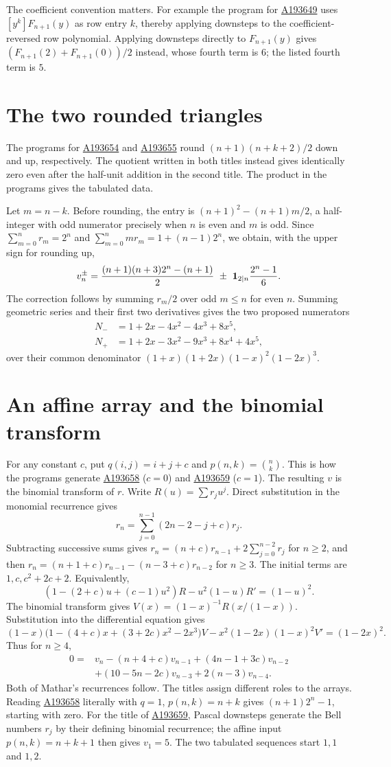 \documentclass[11pt,letterpaper]{article}
\newcommand{\oeis}[1]{\href{https://oeis.org/A#1}{A#1}}
\begin{document}
The coefficient convention matters. For example the program for \oeis{193649} uses $[y^k]F_{n+1}(y)$ as row entry $k$, thereby applying downsteps to the coefficient-reversed row polynomial. Applying downsteps directly to $F_{n+1}(y)$ gives $(F_{n+1}(2)+F_{n+1}(0))/2$ instead, whose fourth term is $6$; the listed fourth term is $5$.

\section{The two rounded triangles}
The programs for \oeis{193654} and \oeis{193655} round $(n+1)(n+k+2)/2$ down and up, respectively. The quotient written in both titles instead gives identically zero even after the half-unit addition in the second title. The product in the programs gives the tabulated data.

Let $m=n-k$. Before rounding, the entry is $(n+1)^2-(n+1)m/2$, a half-integer with odd numerator precisely when $n$ is even and $m$ is odd. Since $\sum_{m=0}^n r_m=2^n$ and $\sum_{m=0}^n mr_m=1+(n-1)2^n$, we obtain, with the upper sign for rounding up,
\[
 v_n^\pm=\frac{(n+1)(n+3)2^n-(n+1)}2
          \ \pm\ {\bf1}_{2\mid n}\frac{2^n-1}{6}.
\]
The correction follows by summing $r_m/2$ over odd $m\le n$ for even $n$. Summing geometric series and their first two derivatives gives the two proposed numerators
\begin{align*}
 N_-&=1+2x-4x^2-4x^3+8x^5,\\
 N_+&=1+2x-3x^2-9x^3+8x^4+4x^5,
\end{align*}
over their common denominator $(1+x)(1+2x)(1-x)^2(1-2x)^3$.

\section{An affine array and the binomial transform}
For any constant $c$, put $q(i,j)=i+j+c$ and $p(n,k)=\binom nk$. This is how the programs generate \oeis{193658} ($c=0$) and \oeis{193659} ($c=1$). The resulting $v$ is the binomial transform of $r$. Write $R(u)=\sum r_ju^j$. Direct substitution in the monomial recurrence gives
\[
 r_n=\sum_{j=0}^{n-1}(2n-2-j+c)r_j .
\]
Subtracting successive sums gives $r_n=(n+c)r_{n-1}+2\sum_{j=0}^{n-2}r_j$ for $n\ge2$, and then
$r_n=(n+1+c)r_{n-1}-(n-3+c)r_{n-2}$ for $n\ge3$.
The initial terms are $1,c,c^2+2c+2$. Equivalently,
\[
 (1-(2+c)u+(c-1)u^2)R-u^2(1-u)R'=(1-u)^2.
\]
The binomial transform gives $V(x)=(1-x)^{-1}R(x/(1-x))$. Substitution into the differential equation gives
\[
 (1-x)\bigl(1-(4+c)x+(3+2c)x^2-2x^3\bigr)V
       -x^2(1-2x)(1-x)^2 V'=(1-2x)^2 .
\]
Thus for $n\ge4$,
\[
\begin{split}
0={}&v_n-(n+4+c)v_{n-1}+(4n-1+3c)v_{n-2}\\
   &+(10-5n-2c)v_{n-3}+2(n-3)v_{n-4}.
\end{split}
\]
Both of Mathar's recurrences follow. The titles assign different roles to the arrays. Reading \oeis{193658} literally with $q=1$, $p(n,k)=n+k$ gives $(n+1)2^n-1$, starting with zero. For the title of \oeis{193659}, Pascal downsteps generate the Bell numbers $r_j$ by their defining binomial recurrence; the affine input $p(n,k)=n+k+1$ then gives $v_1=5$. The two tabulated sequences start $1,1$ and $1,2$.
\end{document}
